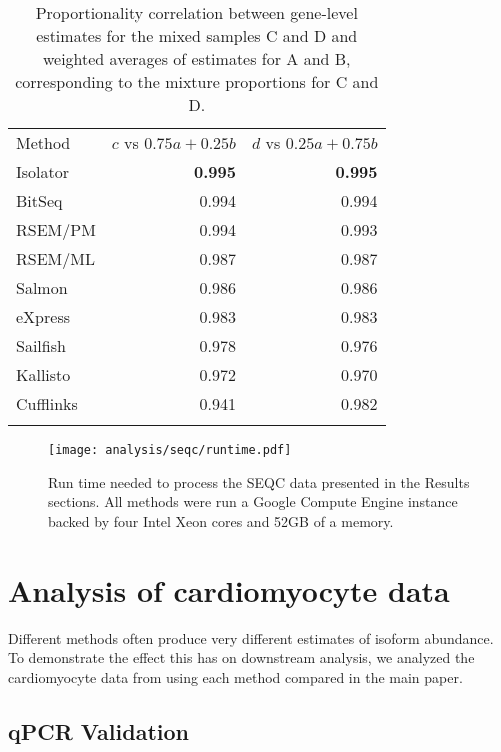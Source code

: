 \documentclass{article}
\begin{document}
\begin{table}
\begin{center}
\begin{tabular}[c]{@{}lrr@{}}
\toprule\addlinespace
Method & $c$ vs $0.75a + 0.25b$ & $d$ vs $0.25a + 0.75b$
\\\addlinespace
\midrule
Isolator & \textbf{0.995} & \textbf{0.995}
\\\addlinespace
BitSeq & 0.994 & 0.994
\\\addlinespace
RSEM/PM & 0.994 & 0.993
\\\addlinespace
RSEM/ML & 0.987 & 0.987
\\\addlinespace
Salmon & 0.986 & 0.986
\\\addlinespace
eXpress & 0.983 & 0.983
\\\addlinespace
Sailfish & 0.978 & 0.976
\\\addlinespace
Kallisto & 0.972 & 0.970
\\\addlinespace
Cufflinks & 0.941 & 0.982
\\\addlinespace
\bottomrule
\addlinespace
\end{tabular}
\caption{Proportionality correlation between gene-level estimates for
the mixed samples C and D and weighted averages of estimates for A and
B, corresponding to the mixture proportions for C and D.}
\end{center}
\label{table:seqcgenes}
\end{table}

\begin{figure}
\begin{center}
\texttt{[image: analysis/seqc/runtime.pdf]}
\caption{Run time needed to process the SEQC data presented in the Results
sections. All methods were run a Google Compute Engine instance backed by four
Intel Xeon cores and 52GB of a memory.}
\end{center}
\label{fig:runtime}
\end{figure}

\section{Analysis of cardiomyocyte data}

Different methods often produce very different estimates of isoform abundance.
To demonstrate the effect this has on downstream analysis, we analyzed the
cardiomyocyte data from \cite{Kuppusamy:2015ey} using each method compared in
the main paper.

\subsection{qPCR Validation}\label{cardioqpcr}
\end{document}
